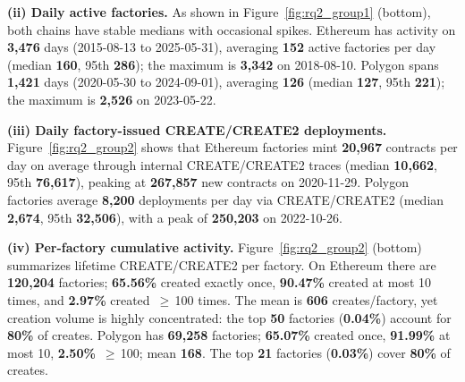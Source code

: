 \documentclass[acmsmall, screen]{acmart}
\begin{document}
	\textbf{(ii) Daily active factories.} As shown in Figure~\ref{fig:rq2_group1} (bottom), both
	chains have stable medians with occasional spikes. Ethereum has activity on \textbf{3{,}476}
	days (2015-08-13 to 2025-05-31), averaging \textbf{152} active factories per day (median \textbf{160},
	95th \textbf{286}); the maximum is \textbf{3{,}342} on 2018-08-10. Polygon spans \textbf{1{,}421}
	days (2020-05-30 to 2024-09-01), averaging \textbf{126} (median \textbf{127}, 95th \textbf{221});
	the maximum is \textbf{2{,}526} on 2023-05-22.

	\textbf{(iii) Daily factory-issued CREATE/CREATE2 deployments.} Figure~\ref{fig:rq2_group2} shows
	that Ethereum factories mint \textbf{20{,}967} contracts per day on average through internal
	CREATE/CREATE2 traces (median \textbf{10{,}662}, 95th \textbf{76{,}617}), peaking at \textbf{267{,}857}
	new contracts on 2020-11-29. Polygon factories average \textbf{8{,}200} deployments per day via
	CREATE/CREATE2 (median \textbf{2{,}674}, 95th \textbf{32{,}506}), with a peak of \textbf{250{,}203} on
	2022-10-26.

	\textbf{(iv) Per-factory cumulative activity.} Figure~\ref{fig:rq2_group2} (bottom) summarizes lifetime
	CREATE/CREATE2 per factory. On Ethereum there are \textbf{120{,}204} factories; \textbf{65.56\%}
	created exactly once, \textbf{90.47\%} created at most 10 times, and \textbf{2.97\%} created \,$\ge$\,100
	times. The mean is \textbf{606} creates/factory, yet creation volume is highly concentrated: the
	top \textbf{50} factories (\textbf{0.04\%}) account for \textbf{80\%} of creates. Polygon has
	\textbf{69{,}258} factories; \textbf{65.07\%} created once, \textbf{91.99\%} at most 10, \textbf{2.50\%}
	\,$\ge$\,100; mean \textbf{168}. The top \textbf{21} factories (\textbf{0.03\%}) cover \textbf{80\%}
	of creates.
\end{document}
